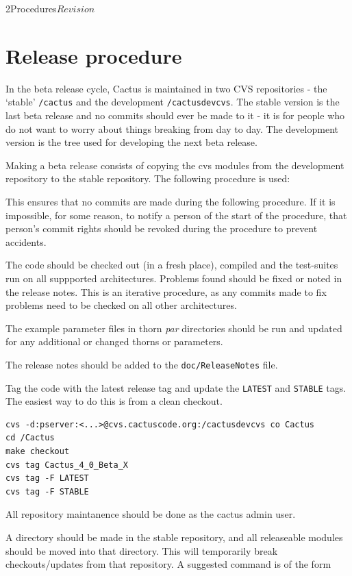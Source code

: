 \begin{cactuspart}{2}{Procedures}{}{$Revision$}
\chapter{Release procedure}

In the beta release cycle, Cactus is maintained in two CVS
repositories - the `stable' \verb./cactus. and the development
\verb./cactusdevcvs..  The stable version is the last beta release and 
no commits should ever be made to it - it is for people who do not
want to worry about things breaking from day to day.  The development
version is the tree used for developing the next beta release.

Making a beta release consists of copying the cvs modules from the
development repository to the stable repository.  The following
procedure is used:

\begin{Lentry}
\item[{\em Notify committers of start of release procedure}]
This ensures that no commits are made during the following procedure.
If it is impossible, for some reason, to notify a person of the start
of the procedure, that person's commit rights should be revoked during 
the procedure to prevent accidents.
\item[{\em Check the code on all supported architectures}]
The code should be checked out (in a fresh place), compiled and the
test-suites run on all suppported architectures.  Problems found
should be fixed or noted in the release notes.  This is an iterative
procedure, as any commits made to fix problems need to be checked on
all other architectures.
\item[{\em Check example parameter files}]
The example parameter files in thorn {\em par} directories should be
run and updated for any additional or changed thorns or parameters.
\item[{\em Update ReleaseNotes}]
The release notes should be added to the \verb|doc/ReleaseNotes| file.
\item[{\em Tag the code}]
Tag the code with the latest release tag and update the {\tt LATEST}
and {\tt STABLE} tags.  The easiest way to do this is from a clean
checkout.
\begin{verbatim}
cvs -d:pserver:<...>@cvs.cactuscode.org:/cactusdevcvs co Cactus
cd /Cactus
make checkout
cvs tag Cactus_4_0_Beta_X
cvs tag -F LATEST
cvs tag -F STABLE
\end{verbatim}

\item[{\em Log into cvs machine as cactus\_admin}]
All repository maintanence should be done as the cactus admin user.
\item[{\em Store old module files}]
A directory should be made in the stable repository, and all
releaseable modules should be moved into that directory.  This will
temporarily break checkouts/updates from that repository.  A suggested 
command is of the form


\end{Lentry}
\end{cactuspart}
